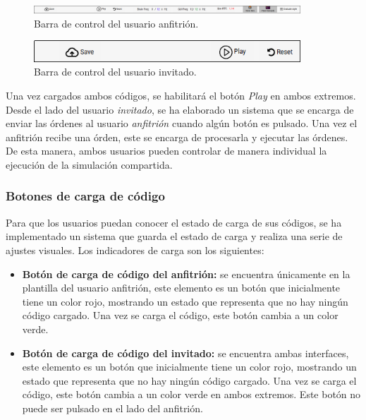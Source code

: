 \documentclass[a4paper, 12pt]{book}
\begin{document}
  \begin{figure}[H]
  	\centering
    \includegraphics[width=10cm]{img/host_sync_control_bar.png}
    \caption{Barra de control del usuario anfitrión.}
    \label{figura:host_sync_control_bar}
  \end{figure}
  \begin{figure}[H]
  	\centering
    \includegraphics[width=10cm]{img/guest_sync_control_bar.png}
    \caption{Barra de control del usuario invitado.}
    \label{figura:guest_sync_control_bar}
  \end{figure}

Una vez cargados ambos códigos, se habilitará el botón \emph{Play} en ambos extremos. Desde el lado del usuario \emph{invitado}, se ha elaborado un sistema que se encarga de enviar las órdenes al usuario \emph{anfitrión} cuando algún botón es pulsado. Una vez el anfitrión recibe una órden, este se encarga de procesarla y ejecutar las órdenes. De esta manera, ambos usuarios pueden controlar de manera individual la ejecución de la simulación compartida.

\subsubsection{Botones de carga de código}

Para que los usuarios puedan conocer el estado de carga de sus códigos, se ha implementado un sistema que guarda el estado de carga y realiza una serie de ajustes visuales. Los indicadores de carga son los siguientes:

\begin{itemize}
\item \textbf{Botón de carga de código del anfitrión:} se encuentra únicamente en la plantilla del usuario anfitrión, este elemento es un botón que inicialmente tiene un color rojo, mostrando un estado que representa que no hay ningún código cargado. Una vez se carga el código, este botón cambia a un color verde.
\item \textbf{Botón de carga de código del invitado:} se encuentra ambas interfaces, este elemento es un botón que inicialmente tiene un color rojo, mostrando un estado que representa que no hay ningún código cargado. Una vez se carga el código, este botón cambia a un color verde en ambos extremos. Este botón no puede ser pulsado en el lado del anfitrión.
\end{itemize}
\end{document}
